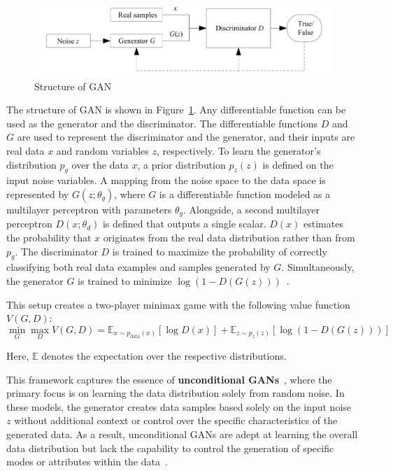 \documentclass[12pt,DIV14,BCOR12mm,a4paper,footinclude=false,headinclude,parskip=half-,twoside,openright,cleardoublepage=empty,toc=index,bibliography=totoc,listof=totoc]{scrreprt}
\numberwithin{equation}{chapter}
\begin{document}
\begin{figure}
	\centering
	\includegraphics[scale=0.7]{../media/structure of GAN1.PNG}
	\caption{Structure of GAN~\cite{wang2017generative}}
	\label{GAN_struct}
\end{figure}

The structure of GAN is shown in Figure~\ref{GAN_struct}. Any differentiable function can be used as the generator and the discriminator. The differentiable functions \( D \) and \( G \) are used to represent the discriminator and the generator, and their inputs are real data \( x \) and random variables \( z \), respectively. To learn the generator's distribution \( p_g\) over the data \( x \), a prior distribution \( p_z(z) \) is defined on the input noise variables. A mapping from the noise space to the data space is represented by \( G(z; \theta_g) \), where \( G \) is a differentiable function modeled as a multilayer perceptron with parameters \( \theta_g \). Alongside, a second multilayer perceptron \( D(x; \theta_d) \) is defined that outputs a single scalar. \( D(x) \) estimates the probability that \( x \) originates from the real data distribution rather than from \( p_g \). The discriminator \( D \) is trained to maximize the probability of correctly classifying both real data examples and samples generated by \( G \). Simultaneously, the generator \( G \) is trained to minimize \( \log(1 - D(G(z))) \)~\cite{wang2017generative}. 

This setup creates a two-player minimax game with the following value function \( V(G, D) \):
\begin{equation}
\min_{G} \max_{D} V(G, D) = \mathbb{E}_{x \sim p_{\text{data}}(x)} [\log D(x)] + \mathbb{E}_{z \sim p_z(z)} [\log(1 - D(G(z)))]
\end{equation}

Here, \( \mathbb{E} \) denotes the expectation over the respective distributions.

This framework captures the essence of \textbf{unconditional GANs}~\cite{georgopoulos2022cluster}, where the primary focus is on learning the data distribution solely from random noise. In these models, the generator creates data samples based solely on the input noise \( z \) without additional context or control over the specific characteristics of the generated data. As a result, unconditional GANs are adept at learning the overall data distribution but lack the capability to control the generation of specific modes or attributes within the data~\cite{lee2022generator}.
\end{document}
